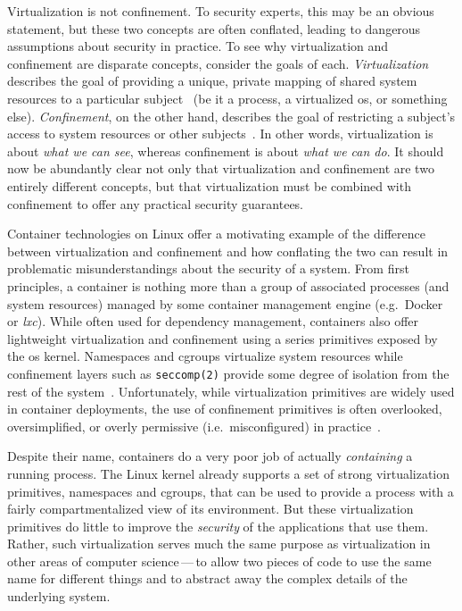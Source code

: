 Virtualization is not confinement. To security experts, this may be an obvious statement,
but these two concepts are often conflated, leading to dangerous assumptions about
security in practice. To see why virtualization and confinement are disparate concepts,
consider the goals of each. \textit{Virtualization} describes the goal of providing
a unique, private mapping of shared system resources to a particular subject~
(be it a process, a virtualized \gls{os}, or something else).
\textit{Confinement}, on the other hand, describes the goal of restricting a subject's
access to system resources or other subjects~. In other words, virtualization
is about \textit{what we can see}, whereas confinement is about \textit{what we can do}.
It should now be abundantly clear not only that virtualization and confinement are two
entirely different concepts, but that virtualization must be combined with confinement to
offer any practical security guarantees.

Container technologies on Linux offer a motivating example of the difference between
virtualization and confinement and how conflating the two can result in problematic
misunderstandings about the security of a system. From first principles, a container is
nothing more than a group of associated processes (and system resources) managed by some
container management engine (e.g.~Docker or \textit{lxc}). While often used for dependency
management, containers also offer lightweight virtualization and confinement using
a series primitives exposed by the \gls{os} kernel. Namespaces and cgroups virtualize
system resources while confinement layers such as \texttt{seccomp(2)} provide some degree
of isolation from the rest of the system~\cite{sultan2019_container_security}.
Unfortunately, while virtualization primitives are widely used in container deployments,
the use of confinement primitives is often overlooked, oversimplified, or overly
permissive (i.e.~misconfigured) in practice~\cite{sultan2019_container_security}.

Despite their name, containers do a very poor job of actually \textit{containing}
a running process.  The Linux kernel already supports a set of strong virtualization
primitives, namespaces and cgroups, that can be used to provide a process with a fairly
compartmentalized view of its environment. But these virtualization primitives do little
to improve the \textit{security} of the applications that use them. Rather, such
virtualization serves much the same purpose as virtualization in other areas of computer
science\,---\,to allow two pieces of code to use the same name for different things and to
abstract away the complex details of the underlying system.

